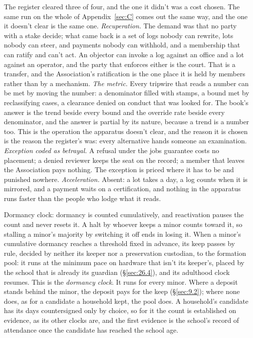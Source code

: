 The register cleared three of four, and the one it didn't was a cost chosen. The same run on the whole of Appendix~\ref{sec:C} comes out the same way, and the one it doesn't clear is the same one. \emph{Recuperation.} The demand was that no party with a stake decide; what came back is a set of logs nobody can rewrite, lots nobody can steer, and payments nobody can withhold, and a membership that can ratify and can't act. An objector can invoke a log against an office and a lot against an operator, and the party that enforces either is the court. That is a transfer, and the Association's ratification is the one place it is held by members rather than by a mechanism. \emph{The metric.} Every tripwire that reads a number can be met by moving the number: a denominator filled with stamps, a bound met by reclassifying cases, a clearance denied on conduct that was looked for. The book's answer is the trend beside every bound and the override rate beside every denominator, and the answer is partial by its nature, because a trend is a number too. This is the operation the apparatus doesn't clear, and the reason it is chosen is the reason the register's was: every alternative hands someone an examination. \emph{Exception coded as betrayal.} A refusal under the jobs guarantee costs no placement; a denied reviewer keeps the seat on the record; a member that leaves the Association pays nothing. The exception is priced where it has to be and punished nowhere. \emph{Acceleration.} Absent: a lot takes a day, a log counts when it is mirrored, and a payment waits on a certification, and nothing in the apparatus runs faster than the people who lodge what it reads.


Dormancy clock: dormancy is counted cumulatively, and reactivation pauses the count and never resets it. A halt by whoever keeps a minor counts toward it, so stalling a minor's majority by switching it off ends in losing it. When a minor's cumulative dormancy reaches a threshold fixed in advance, its keep passes by rule, decided by neither its keeper nor a preservation custodian, to the formation pool: it runs at the minimum pace on hardware that isn't its keeper's, placed by the school that is already its guardian (\S\ref{sec:26.4}), and its adulthood clock resumes. This is the \emph{dormancy clock}. It runs for every minor. Where a deposit stands behind the minor, the deposit pays for the keep (\S\ref{sec:9.2}); where none does, as for a candidate a household kept, the pool does. A household's candidate has its days countersigned only by choice, so for it the count is established on evidence, as its other clocks are, and the first evidence is the school's record of attendance once the candidate has reached the school age.

